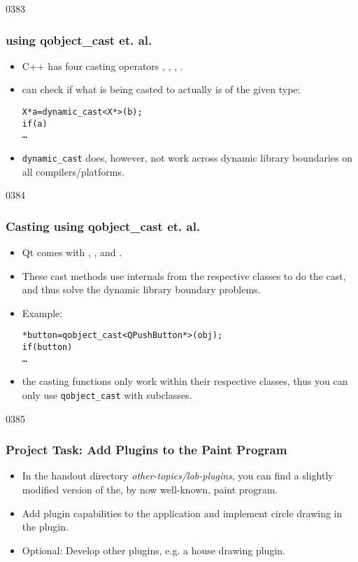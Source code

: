 \begin{slide}[fragile]{0383} \frametitle{ using qobject\_cast et. al.}
\label{casting}
\begin{itemize}
\item C++ has four casting operators ,
  , ,
  .
\item {} can check if what is being casted
  to actually is of the given type:
\begin{alltt}
X* a = dynamic\_cast<X*>( b );
if ( a )
  \ldots
\end{alltt}
\item \texttt{dynamic\_cast} does, however, not work across dynamic library
  boundaries on all compilers/platforms.
\end{itemize}
\end{slide}

\begin{slide}[fragile]{0384}\frametitle{Casting using qobject\_cast et. al.}
\begin{itemize}
\item Qt comes with , , and
  . 
\item These cast methods use internals from the
  respective classes to do the cast, and thus solve the dynamic library
  boundary problems.
\item Example:
\begin{alltt}
* button = qobject_cast<QPushButton *>(obj);
if ( button )
  \ldots
\end{alltt}
\item \pleaseNote the casting functions only work within their respective
  classes, thus you can only use \texttt{qobject\_cast} with
   subclasses.
\end{itemize}
\end{slide}

\begin{slide}{0385}\frametitle{Project Task: Add Plugins to the Paint Program}
\begin{itemize}
\item In the handout directory \emph{other-topics/lab-plugins}, you
  can find a slightly modified version of the, by now well-known, paint
  program.
\item Add plugin capabilities to the application and implement circle
  drawing in the plugin.
\item Optional: Develop other plugins, e.g. a house drawing plugin.
\end{itemize}
\end{slide}
